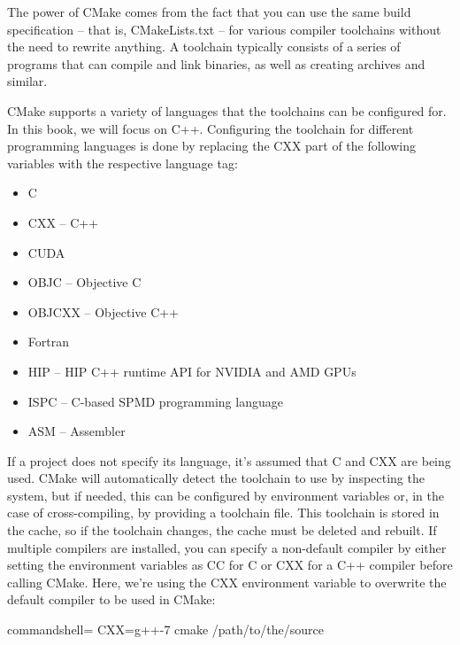 The power of CMake comes from the fact that you can use the same build specification – that is, CMakeLists.txt – for various compiler toolchains without the need to rewrite anything. A toolchain typically consists of a series of programs that can compile and link binaries, as well as creating archives and similar.

CMake supports a variety of languages that the toolchains can be configured for. In this book, we will focus on C++. Configuring the toolchain for different programming languages is done by replacing the CXX part of the following variables with the respective language tag:

\begin{itemize}
\item 
C

\item 
CXX – C++

\item 
CUDA

\item 
OBJC – Objective C

\item 
OBJCXX – Objective C++

\item 
Fortran

\item 
HIP – HIP C++ runtime API for NVIDIA and AMD GPUs

\item 
ISPC – C-based SPMD programming language

\item 
ASM – Assembler
\end{itemize}

If a project does not specify its language, it's assumed that C and CXX are being used. CMake will automatically detect the toolchain to use by inspecting the system, but if needed, this can be configured by environment variables or, in the case of cross-compiling, by providing a toolchain file. This toolchain is stored in the cache, so if the toolchain changes, the cache must be deleted and rebuilt. If multiple compilers are installed, you can specify a non-default compiler by either setting the environment variables as CC for C or CXX for a C++ compiler before calling CMake. Here, we're using the CXX environment variable to overwrite the default compiler to be used in CMake:


\begin{tcblisting}{commandshell={}}
CXX=g++-7 cmake /path/to/the/source
\end{tcblisting}

